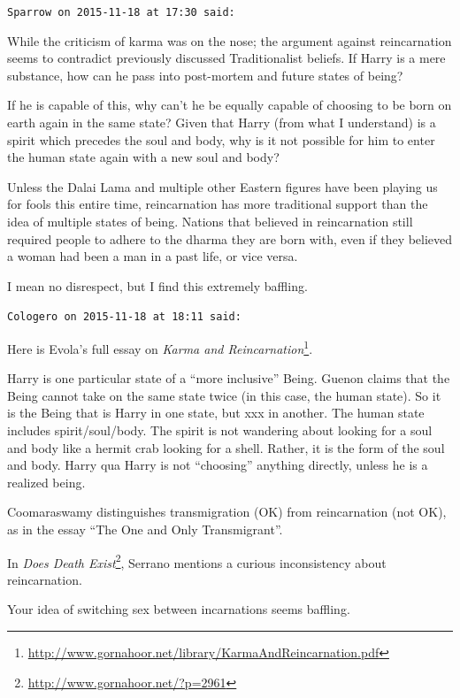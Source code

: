 \begin{footnotesize}
\begin{sffamily}

\texttt{Sparrow on 2015-11-18 at 17:30 said:}

While the criticism of karma was on the nose; the argument against reincarnation seems to contradict previously discussed Traditionalist beliefs. If Harry is a mere substance, how can he pass into post-mortem and future states of being?

If he is capable of this, why can't he be equally capable of choosing to be born on earth again in the same state? Given that Harry (from what I understand) is a spirit which precedes the soul and body, why is it not possible for him to enter the human state again with a new soul and body?

Unless the Dalai Lama and multiple other Eastern figures have been playing us for fools this entire time, reincarnation has more traditional support than the idea of multiple states of being. Nations that believed in reincarnation still required people to adhere to the dharma they are born with, even if they believed a woman had been a man in a past life, or vice versa.

I mean no disrespect, but I find this extremely baffling.

\hfill

\texttt{Cologero on 2015-11-18 at 18:11 said:}

Here is Evola's full essay on \textit{Karma and Reincarnation}\footnote{\url{http://www.gornahoor.net/library/KarmaAndReincarnation.pdf}}.

Harry is one particular state of a ``more inclusive'' Being. Guenon claims that the Being cannot take on the same state twice (in this case, the human state). So it is the Being that is Harry in one state, but xxx in another. The human state includes spirit/soul/body. The spirit is not wandering about looking for a soul and body like a hermit crab looking for a shell. Rather, it is the form of the soul and body. Harry qua Harry is not ``choosing'' anything directly, unless he is a realized being.

Coomaraswamy distinguishes transmigration (OK) from reincarnation (not OK), as in the essay ``The One and Only Transmigrant''.

In \textit{Does Death Exist}\footnote{\url{http://www.gornahoor.net/?p=2961}}, Serrano mentions a curious inconsistency about reincarnation.

Your idea of switching sex between incarnations seems baffling.


\end{sffamily}
\end{footnotesize}

